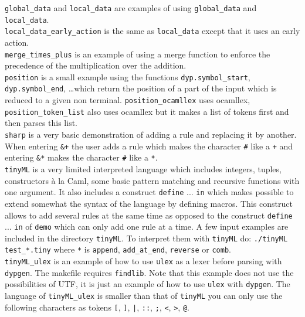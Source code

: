 \documentclass[12pt]{article}
\begin{document}
{\verb|global_data| and \verb|local_data| are examples of using \verb|global_data| and \verb|local_data|.\\
\verb|local_data_early_action| is the same as \verb|local_data| except that it uses an early action.\\

\verb|merge_times_plus| is an example of using a merge function to enforce the precedence of the multiplication over the addition.\\

\verb|position| is a small example using the functions \verb|dyp.symbol_start|, \verb|dyp.symbol_end|, \ldots which return the position of a part of the input which is reduced to a given non terminal. \verb|position_ocamllex| uses ocamllex, \verb|position_token_list| also uses ocamllex but it makes a list of tokens first and then parses this list.\\

\verb|sharp| is a very basic demonstration of adding a rule and replacing it by another. When entering \verb|&+| the user adds a rule which makes the character \verb|#| like a \verb|+| and entering \verb|&*| makes the character \verb|#| like a \verb|*|.\\

\verb|tinyML| is a very limited interpreted language which includes integers, tuples, constructors \`a la Caml, some basic pattern matching and recursive functions with one argument. It also includes a construct \verb|define| ... \verb|in| which makes possible to extend somewhat the syntax of the language by defining macros. This construct allows to add several rules at the same time as opposed to the construct \verb|define| ... \verb|in| of \verb|demo| which can only add one rule at a time. A few input examples are included in the directory \verb|tinyML|. To interpret them with \verb|tinyML| do: \verb|./tinyML test_*.tiny| where \verb|*| is \verb|append|, \verb|add_at_end|, \verb|reverse| or \verb|comb|.\\

\verb|tinyML_ulex| is an example of how to use \verb|ulex| as a lexer before parsing with \verb|dypgen|. The makefile requires \verb|findlib|. Note that this example does not use the possibilities of UTF, it is just an example of how to use \verb|ulex| with \verb|dypgen|. The language of \verb|tinyML_ulex| is smaller than that of \verb|tinyML| you can only use the following characters as tokens \verb|[|, \verb|]|, \verb$|$, \verb|::|, \verb|;|, \verb|<|, \verb|>|, \verb|@|.\\

}
\end{document}
